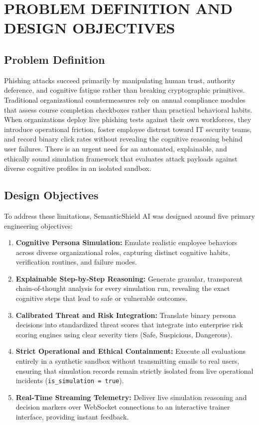 \documentclass[conference,letterpaper]{IEEEtran}
\begin{document}
\section{PROBLEM DEFINITION AND DESIGN OBJECTIVES}

\subsection{Problem Definition}
Phishing attacks succeed primarily by manipulating human trust, authority deference, and cognitive fatigue rather than breaking cryptographic primitives. Traditional organizational countermeasures rely on annual compliance modules that assess course completion checkboxes rather than practical behavioral habits. When organizations deploy live phishing tests against their own workforces, they introduce operational friction, foster employee distrust toward IT security teams, and record binary click rates without revealing the cognitive reasoning behind user failures. There is an urgent need for an automated, explainable, and ethically sound simulation framework that evaluates attack payloads against diverse cognitive profiles in an isolated sandbox.

\subsection{Design Objectives}
To address these limitations, SemanticShield AI was designed around five primary engineering objectives:
\begin{enumerate}
    \item \textbf{Cognitive Persona Simulation:} Emulate realistic employee behaviors across diverse organizational roles, capturing distinct cognitive habits, verification routines, and failure modes.
    \item \textbf{Explainable Step-by-Step Reasoning:} Generate granular, transparent chain-of-thought analysis for every simulation run, revealing the exact cognitive steps that lead to safe or vulnerable outcomes.
    \item \textbf{Calibrated Threat and Risk Integration:} Translate binary persona decisions into standardized threat scores that integrate into enterprise risk scoring engines using clear severity tiers (Safe, Suspicious, Dangerous).
    \item \textbf{Strict Operational and Ethical Containment:} Execute all evaluations entirely in a synthetic sandbox without transmitting emails to real users, ensuring that simulation records remain strictly isolated from live operational incidents (\texttt{is\_simulation = true}).
    \item \textbf{Real-Time Streaming Telemetry:} Deliver live simulation reasoning and decision markers over WebSocket connections to an interactive trainer interface, providing instant feedback.
\end{enumerate}
\end{document}
